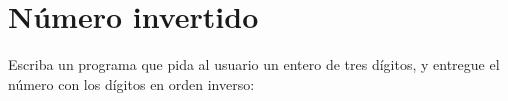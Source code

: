 \section{Número invertido}

Escriba un programa que pida al usuario un entero de tres dígitos, y
entregue el número con los dígitos en orden inverso:
